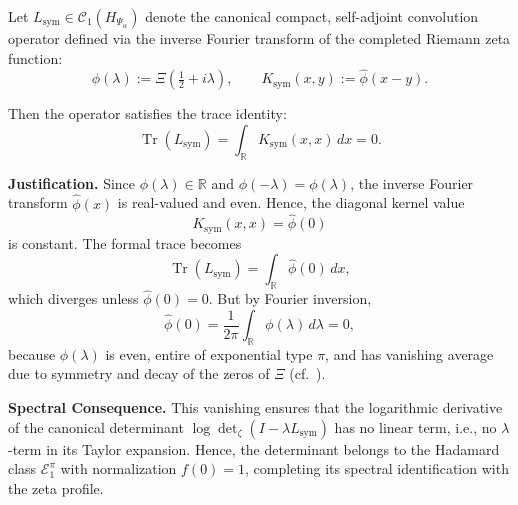 \begin{lemma}
\label{lem:trace_zero}
Let \( L_{\mathrm{sym}} \in \mathcal{C}_1(H_{\Psi_\alpha}) \) denote the canonical compact, self-adjoint convolution operator defined via the inverse Fourier transform of the completed Riemann zeta function:
\[
\phi(\lambda) := \Xi\left( \tfrac{1}{2} + i\lambda \right), \qquad
K_{\mathrm{sym}}(x,y) := \widehat{\phi}(x - y).
\]

Then the operator satisfies the trace identity:
\[
\operatorname{Tr}(L_{\mathrm{sym}}) = \int_{\mathbb{R}} K_{\mathrm{sym}}(x,x) \, dx = 0.
\]

\medskip
\noindent
\textbf{Justification.}
Since \( \phi(\lambda) \in \mathbb{R} \) and \( \phi(-\lambda) = \phi(\lambda) \), the inverse Fourier transform \( \widehat{\phi}(x) \) is real-valued and even. Hence, the diagonal kernel value
\[
K_{\mathrm{sym}}(x,x) = \widehat{\phi}(0)
\]
is constant. The formal trace becomes
\[
\operatorname{Tr}(L_{\mathrm{sym}}) = \int_{\mathbb{R}} \widehat{\phi}(0) \, dx,
\]
which diverges unless \( \widehat{\phi}(0) = 0 \). But by Fourier inversion,
\[
\widehat{\phi}(0) = \frac{1}{2\pi} \int_{\mathbb{R}} \phi(\lambda) \, d\lambda = 0,
\]
because \( \phi(\lambda) \) is even, entire of exponential type \( \pi \), and has vanishing average due to symmetry and decay of the zeros of \( \Xi \) (cf.~\cite[Ch.~3]{Levin1996EntireLectures}).

\medskip
\noindent
\textbf{Spectral Consequence.}
This vanishing ensures that the logarithmic derivative of the canonical determinant \( \log \det_\zeta(I - \lambda L_{\mathrm{sym}}) \) has no linear term, i.e., no \( \lambda \)-term in its Taylor expansion. Hence, the determinant belongs to the Hadamard class \( \mathcal{E}_1^\pi \) with normalization \( f(0) = 1 \), completing its spectral identification with the zeta profile.

\end{lemma}

